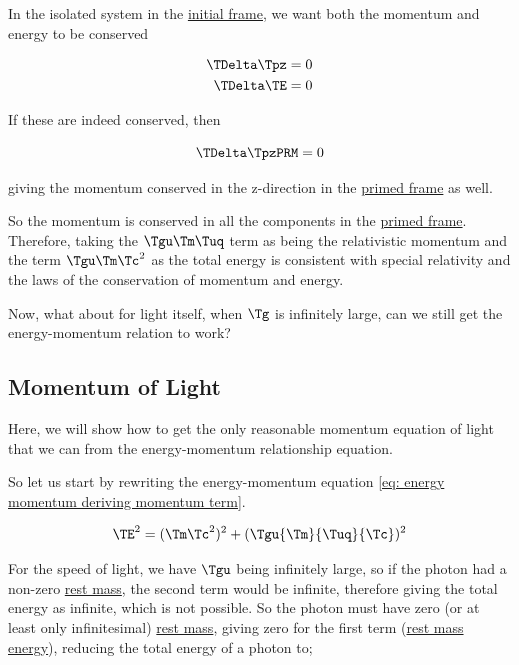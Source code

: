 \begin{derivation}
In the isolated system in the \hyperlink{def-initial-Frame}{initial frame}, we want both the momentum and energy to be conserved

\begin{equation}
	\begin{aligned}
		\TDelta  \Tpz  & =0 \\
		\TDelta  \TE  & =0
	\end{aligned}
\end{equation}

If these are indeed conserved, then

\begin{equation}
	\TDelta  \TpzPRM  = 0
\end{equation}

giving the momentum conserved in the z-direction in the \hyperlink{def-Primed-Frame}{primed frame} as well.

\end{derivation}

So the momentum is conserved in all the components in the \hyperlink{def-Primed-Frame}{primed frame}.
Therefore, taking the $\Tgu  \Tm  \Tuq $ term as being the relativistic momentum and the term $\Tgu  \Tm  \Tc ^2$ as the total energy is consistent with special relativity and the laws of the conservation of momentum and energy.

Now, what about for light itself, when $\Tg $ is infinitely large, can we still get the energy-momentum relation to work?

\subsection{Momentum of Light}\label{subsect: Momentum of Light}

Here, we will show how to get the only reasonable momentum equation of light that we can from the energy-momentum relationship equation.

So let us start by rewriting the energy-momentum equation \eqref{eq: energy momentum deriving momentum term}.

\begin{equation}
		\TE ^2 = (\Tm \Tc ^2)^2 + (\Tgu {\Tm }{\Tuq }{\Tc })^2
\end{equation}

For the speed of light, we have $\Tgu $ being infinitely large, so if the photon had a non-zero \hyperlink{def-rest-mass}{rest mass}, the second term would be infinite, therefore giving the total energy as infinite, which is not possible.
So the photon must have zero (or at least only infinitesimal) \hyperlink{def-rest-mass}{rest mass}, giving zero for the first term (\hyperlink{def-rest-mass-energy}{rest mass energy}), reducing the total energy of a photon to;

